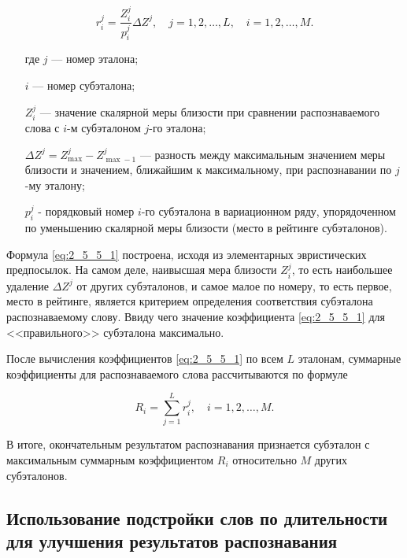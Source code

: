 \begin{equation}\label{eq:2_5_5_1}
r_i^j = \frac{Z_i^j}{p_i^j} \Delta Z^j,
\quad
j = 1, 2, \dots, L,
\quad
i = 1, 2, \dots, M.
\end{equation}
\begin{itemize}[align=left,leftmargin=1.8em,itemindent=0pt,labelsep=0pt,labelwidth=1.8em]
	\item[где] $j$ --- номер эталона;
	\item[] $i$ --- номер субэталона;
	\item[] $Z_i^j$ --- значение скалярной меры близости при сравнении распознаваемого слова с $i$-м субэталоном $j$-го эталона;
	\item[] $\Delta Z^j = Z_{\max}^j - Z_{\max-1}^j$ --- разность между максимальным значением меры близости и значением, ближайшим к максимальному, при распознавании по $j$-му эталону;
	\item[] $p_i^j$ - порядковый номер $i$-го субэталона в вариационном ряду, упорядоченном по уменьшению скалярной меры близости (место в рейтинге субэталонов).
\end{itemize}

Формула \eqref{eq:2_5_5_1} построена, исходя из элементарных эвристических предпосылок.
На самом деле, наивысшая мера близости $Z_i^j$, то есть наибольшее удаление $\Delta Z^j$ от других субэталонов, и самое малое по номеру, то есть первое, место в рейтинге, является критерием определения соответствия субэталона распознаваемому слову.
Ввиду чего значение коэффициента \eqref{eq:2_5_5_1} для <<правильного>> субэталона максимально.

После вычисления коэффициентов \eqref{eq:2_5_5_1} по всем $L$ эталонам, суммарные коэффициенты для распознаваемого слова рассчитываются по формуле

\begin{equation}\label{eq:2_5_5_2}
R_i = \sum_{j=1}^L r_i^j,
\quad
i = 1, 2, \dots, M.
\end{equation}

В итоге, окончательным результатом распознавания признается субэталон с максимальным суммарным коэффициентом $R_i$ относительно $M$ других субэталонов.


\subsection{Использование подстройки слов по длительности для улучшения результатов распознавания} \label{sect2_5_6}

